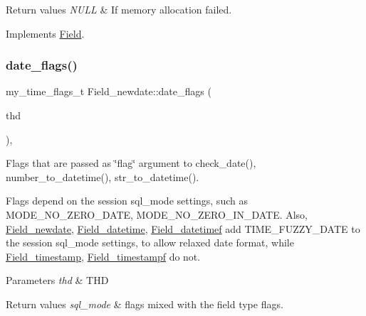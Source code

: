 \begin{DoxyRetVals}{Return values}
{\em N\+U\+LL} & If memory allocation failed. \\
\hline
\end{DoxyRetVals}


Implements \mbox{\hyperlink{classField_a01a9a9aa3a618941e839b1b8793c969d}{Field}}.

\mbox{\label{classField__newdate_af680898e732203af05d7254e37633d71}} 
\subsubsection{\texorpdfstring{date\+\_\+flags()}{date\_flags()}}
{\footnotesize\ttfamily my\+\_\+time\+\_\+flags\+\_\+t Field\+\_\+newdate\+::date\+\_\+flags (\begin{DoxyParamCaption}\item[{const T\+HD $\ast$}]{thd }\end{DoxyParamCaption})\hspace{0.3cm}{\ttfamily [protected]}, {\ttfamily [virtual]}}

Flags that are passed as \char`\"{}flag\char`\"{} argument to check\+\_\+date(), number\+\_\+to\+\_\+datetime(), str\+\_\+to\+\_\+datetime().

Flags depend on the session sql\+\_\+mode settings, such as M\+O\+D\+E\+\_\+\+N\+O\+\_\+\+Z\+E\+R\+O\+\_\+\+D\+A\+TE, M\+O\+D\+E\+\_\+\+N\+O\+\_\+\+Z\+E\+R\+O\+\_\+\+I\+N\+\_\+\+D\+A\+TE. Also, \mbox{\hyperlink{classField__newdate}{Field\+\_\+newdate}}, \mbox{\hyperlink{classField__datetime}{Field\+\_\+datetime}}, \mbox{\hyperlink{classField__datetimef}{Field\+\_\+datetimef}} add T\+I\+M\+E\+\_\+\+F\+U\+Z\+Z\+Y\+\_\+\+D\+A\+TE to the session sql\+\_\+mode settings, to allow relaxed date format, while \mbox{\hyperlink{classField__timestamp}{Field\+\_\+timestamp}}, \mbox{\hyperlink{classField__timestampf}{Field\+\_\+timestampf}} do not.


\begin{DoxyParams}{Parameters}
{\em thd} & T\+HD \\
\hline
\end{DoxyParams}

\begin{DoxyRetVals}{Return values}
{\em sql\+\_\+mode} & flags mixed with the field type flags. \\
\hline
\end{DoxyRetVals}


